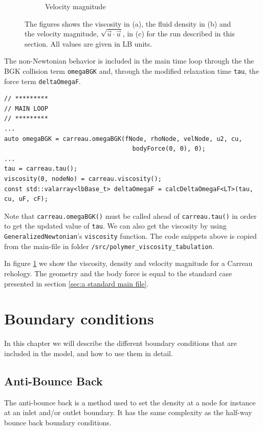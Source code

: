 \documentclass[11pt,a4paper]{report}
\begin{document}
\begin{figure}[!h]
\begin{subfigure}{0.30\textwidth}
		\caption{Velocity magnitude}
	\end{subfigure}	
	\caption{The figures shows the viscosity in (a), the fluid density in (b) and the velocity magnitude, $\sqrt{\vec{u}\cdot\vec{u}}$, in (c) for the run described in this section. All values are given in LB units.}
	\label{fig:polymer rho vel}
\end{figure}

The non-Newtonian behavior is included in the main time loop through the the BGK collision term \texttt{omegaBGK} and, through the modified relaxation time \texttt{tau}, the force term \texttt{deltaOmegaF}.
\begin{verbatim}
// *********
// MAIN LOOP
// *********
...
auto omegaBGK = carreau.omegaBGK(fNode, rhoNode, velNode, u2, cu,
                                   bodyForce(0, 0), 0);
...
tau = carreau.tau();
viscosity(0, nodeNo) = carreau.viscosity();
const std::valarray<lbBase_t> deltaOmegaF = calcDeltaOmegaF<LT>(tau, cu, uF, cF);
\end{verbatim}
Note that \texttt{carreau.omegaBGK()} must be called ahead of \texttt{carreau.tau()} in order to get the updated value of \texttt{tau}. We can also get the viscosity by using \texttt{GeneralizedNewtonian}'s \texttt{viscosity} function. The code snippets above is copied from the main-file in folder \texttt{/src/polymer\_viscosity\_tabulation}.
    

In figure \ref{fig:polymer rho vel} we show the viscosity, density and velocity magnitude for a Carreau rehology. The geometry and the body force is equal to the standard case presented in section \ref{sec:a standard main file}.

\chapter{Boundary conditions}
In this chapter we will describe the different boundary conditions that are included in the model, and how to use them in detail.

\section{Anti-Bounce Back}
The anti-bounce back is a method used to set the density at a node for instance at an inlet and/or outlet boundary. It has the same complexity as the half-way bounce back boundary conditions. 
\end{document}
